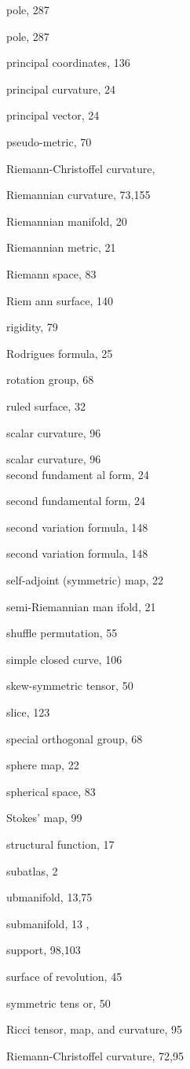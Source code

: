 \documentclass[10pt]{article}
\begin{document}
pole, 287

pole, 287

principal coordinates, 136

principal curvature, 24

principal vector, 24

pseudo-metric, 70

Riemann-Christoffel curvature,

Riemannian curvature, 73,155

Riemannian manifold, 20

Riemannian metric, 21

Riemann space, 83

Riem ann surface, 140

rigidity, 79

Rodrigues formula, 25

rotation group, 68

ruled surface, 32

scalar curvature, 96

scalar curvature, 96\\
second fundament al form, 24

second fundamental form, 24

second variation formula, 148

second variation formula, 148

self-adjoint (symmetric) map, 22

semi-Riemannian man ifold, 21

shuffle permutation, 55

simple closed curve, 106

skew-symmetric tensor, 50

slice, 123

special orthogonal group, 68

sphere map, 22

spherical space, 83

Stokes' map, 99

structural function, 17

subatlas, 2

ubmanifold, 13,75

submanifold, 13 ,

support, 98,103

surface of revolution, 45

symmetric tens or, 50

Ricci tensor, map, and curvature, 95

Riemann-Christoffel curvature, 72,95
\end{document}

